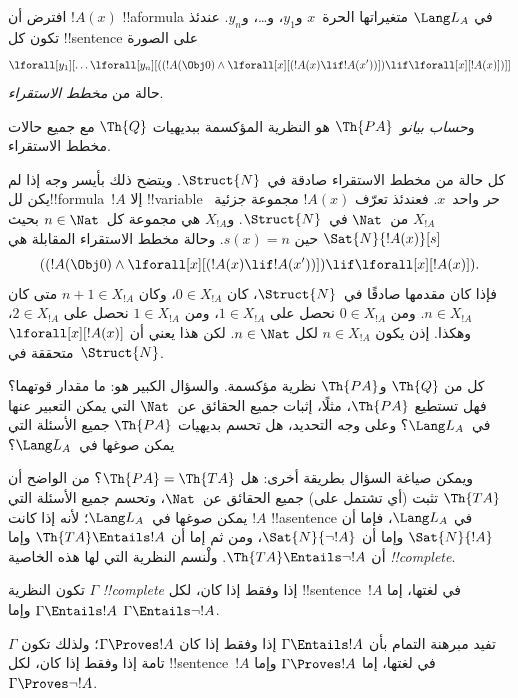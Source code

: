 \documentclass[../../../include/open-logic-section]{subfiles}
\begin{document}
\begin{defn}
افترض أن $!A(x)$ !!a{formula} في $\Lang L_A$ متغيراتها الحرة~$x$
و$y_1$، و\dots، و$y_n$. عندئذ تكون كل !!{sentence} على الصورة
\[
\lforall[y_1][\dots\lforall[y_n][((!A(\Obj 0) \land \lforall[x][(!A(x)
\lif !A(x'))]) \lif \lforall[x][!A(x)])]]
\]
حالة من \emph{مخطط الاستقراء}.

و\emph{حساب بيانو}~$\Th{PA}$ هو النظرية المؤكسمة ببديهيات $\Th{Q}$
مع جميع حالات مخطط الاستقراء.
\end{defn}

\begin{explain}
كل حالة من مخطط الاستقراء صادقة في~$\Struct{N}$. ويتضح ذلك بأيسر وجه
إذا لم يكن لل!!{formula}~$!A$ إلا !!{variable} حر واحد~$x$. فعندئذ
تعرّف $!A(x)$ مجموعة جزئية~$X_{!A}$ من~$\Nat$ في~$\Struct{N}$.
و$X_{!A}$ هي مجموعة كل~$n\in\Nat$ بحيث
$\Sat{N}{!A(x)}[s]$ حين $s(x)=n$. وحالة مخطط الاستقراء المقابلة هي
\[
((!A(\Obj 0) \land \lforall[x][(!A(x) \lif !A(x'))]) \lif
  \lforall[x][!A(x)]).
\]
فإذا كان مقدمها صادقًا في~$\Struct{N}$، كان $0\in X_{!A}$، وكان
$n+1\in X_{!A}$ متى كان $n\in X_{!A}$. ومن $0\in X_{!A}$ نحصل على
$1\in X_{!A}$، ومن $1\in X_{!A}$ نحصل على $2\in X_{!A}$، وهكذا.
إذن يكون $n\in X_{!A}$ لكل $n\in\Nat$. لكن هذا يعني أن
$\lforall[x][!A(x)]$ متحققة في~$\Struct{N}$.
\end{explain}

كل من $\Th{Q}$ و$\Th{PA}$ نظرية مؤكسمة. والسؤال الكبير هو: ما مقدار
قوتهما؟ فهل تستطيع $\Th{PA}$، مثلًا، إثبات جميع الحقائق عن~$\Nat$
التي يمكن التعبير عنها في~$\Lang L_A$؟ وعلى وجه التحديد، هل تحسم
بديهيات $\Th{PA}$ جميع الأسئلة التي يمكن صوغها في~$\Lang L_A$؟

ويمكن صياغة السؤال بطريقة أخرى: هل $\Th{PA}=\Th{TA}$؟ من الواضح أن
$\Th{TA}$ تثبت (أي تشتمل على) جميع الحقائق عن~$\Nat$، وتحسم جميع
الأسئلة التي يمكن صوغها في~$\Lang L_A$؛ لأنه إذا كانت $!A$
!!a{sentence} في $\Lang L_A$، فإما أن $\Sat{N}{!A}$ وإما أن
$\Sat{N}{\lnot !A}$، ومن ثم إما أن $\Th{TA}\Entails !A$ وإما أن
$\Th{TA}\Entails\lnot !A$. ولْنسم النظرية التي لها هذه الخاصية
\emph{!!{complete}}.

\begin{defn}
تكون النظرية $\Gamma$ \emph{!!{complete}} إذا وفقط إذا كان، لكل
!!{sentence}~$!A$ في لغتها، إما $\Gamma\Entails !A$ وإما
$\Gamma\Entails\lnot !A$.
\end{defn}

\begin{explain}
تفيد مبرهنة التمام بأن $\Gamma\Entails !A$ إذا وفقط إذا كان
$\Gamma\Proves !A$؛ ولذلك تكون $\Gamma$ تامة إذا وفقط إذا كان، لكل
!!{sentence}~$!A$ في لغتها، إما $\Gamma\Proves !A$ وإما
$\Gamma\Proves\lnot !A$.
\end{explain}
\end{document}
